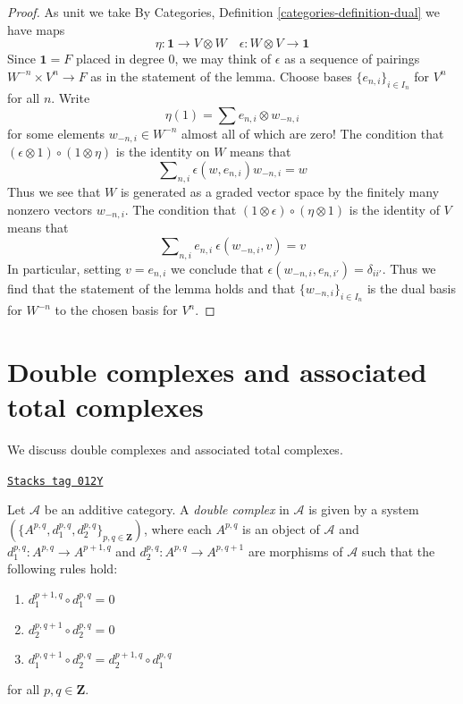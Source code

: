\begin{proof}
As unit we take
By Categories, Definition \ref{categories-definition-dual} we have
maps
$$
\eta : \mathbf{1} \to V \otimes W\quad
\epsilon : W \otimes V \to \mathbf{1}
$$
Since $\mathbf{1} = F$ placed in degree $0$, we
may think of $\epsilon$ as a sequence of pairings
$W^{-n} \times V^n \to F$ as in the statement of the lemma.
Choose bases $\{e_{n, i}\}_{i \in I_n}$ for $V^n$ for all $n$.
Write
$$
\eta(1) = \sum e_{n, i} \otimes w_{-n, i}
$$
for some elements $w_{-n, i} \in W^{-n}$ almost all of which are zero!
The condition that $(\epsilon \otimes 1) \circ (1 \otimes \eta)$ is the
identity on $W$ means that
$$
\sum\nolimits_{n, i} \epsilon(w, e_{n, i})w_{-n, i} = w
$$
Thus we see that $W$ is generated as a graded vector space
by the finitely many nonzero vectors $w_{-n, i}$.
The condition that $(1 \otimes \epsilon) \circ (\eta \otimes 1)$
is the identity of $V$ means that
$$
\sum\nolimits_{n, i} e_{n, i}\ \epsilon(w_{-n, i}, v) = v
$$
In particular, setting $v = e_{n, i}$ we conclude that
$\epsilon(w_{-n, i}, e_{n, i'}) = \delta_{ii'}$. Thus
we find that the statement of the lemma holds and that
$\{w_{-n, i}\}_{i \in I_n}$ is the dual basis for $W^{-n}$ to
the chosen basis for $V^n$.
\end{proof}

\section{Double complexes and associated total complexes}
\label{homology-section-double-complexes}
We discuss double complexes and associated total complexes.

\begin{definition}
\label{homology-definition-double-complex}
\href{https://stacks.math.columbia.edu/tag/012Y}{\texttt{Stacks tag 012Y}}

Let $\mathcal{A}$ be an additive category.
A {\it double complex} in $\mathcal{A}$ is given
by a system $(\{A^{p, q}, d_1^{p, q}, d_2^{p, q}\}_{p, q\in \mathbf{Z}})$,
where each $A^{p, q}$ is an object of $\mathcal{A}$ and
$d_1^{p, q} : A^{p, q} \to A^{p + 1, q}$ and
$d_2^{p, q} : A^{p, q} \to A^{p, q + 1}$ are morphisms of $\mathcal{A}$
such that the following rules hold:
\begin{enumerate}
\item $d_1^{p + 1, q} \circ d_1^{p, q} = 0$
\item $d_2^{p, q + 1} \circ d_2^{p, q} = 0$
\item $d_1^{p, q + 1} \circ d_2^{p, q} = d_2^{p + 1, q} \circ d_1^{p, q}$
\end{enumerate}
for all $p, q \in \mathbf{Z}$.
\end{definition}

